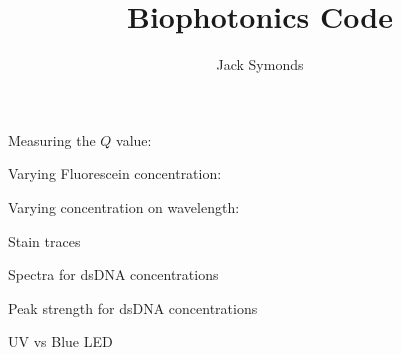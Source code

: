 \documentclass[8pt, a4paper]{article}
\title{Biophotonics Code}
\author{Jack Symonds}
\date{}
\begin{document}
\maketitle

Measuring the $Q$ value:


\newpage
Varying Fluorescein concentration:


\newpage
Varying concentration on wavelength:


\newpage
Stain traces


\newpage
Spectra for dsDNA concentrations


\newpage
Peak strength for dsDNA concentrations


\newpage
UV vs Blue LED

\end{document}
